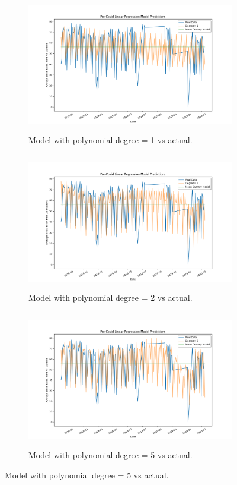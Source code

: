 \documentclass{article}
\begin{document}
\begin{figure} [H]
\centering
\begin{subfigure}{.49\linewidth}
  \centering
  \includegraphics[width=\linewidth, height=6cm]{featuremodel1.png}
  \caption{Model with polynomial degree = 1 vs actual.}
  \label{fig:sub1}
\end{subfigure}%
\begin{subfigure}{.49\textwidth}
  \centering
  \includegraphics[width=\linewidth, height=6cm]{featuremodel2.png}
  \caption{Model with polynomial degree = 2 vs actual.}
  \label{fig:sub2}
\end{subfigure}
\label{fig:test}
\begin{subfigure}{.49\linewidth}
  \centering
  \includegraphics[width=\linewidth, height=6cm]{featuremodel5.png}
  \caption{Model with polynomial degree = 5 vs actual.}

\end{subfigure}
\end{figure}
\end{document}
